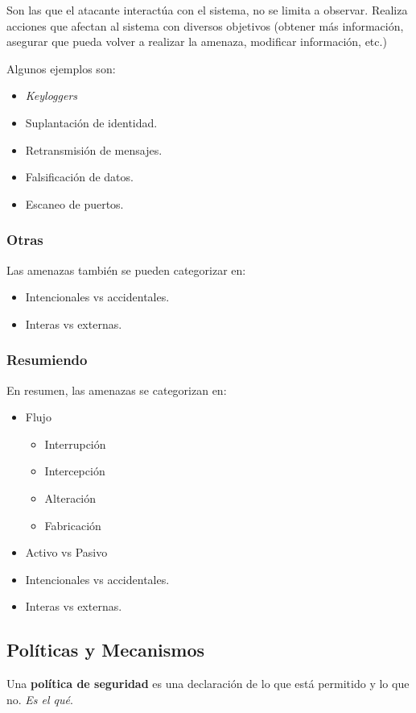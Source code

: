 \documentclass[]{article}
\begin{document}
Son las que el atacante interactúa con el sistema, no se limita a observar. Realiza acciones que afectan al sistema con diversos objetivos (obtener más información, asegurar que pueda volver a realizar la amenaza, modificar información, etc.)

Algunos ejemplos son:
\begin{itemize}
	\item \emph{Keyloggers}
	\item Suplantación de identidad.
	\item Retransmisión de mensajes.
	\item Falsificación de datos.
	\item Escaneo de puertos.
\end{itemize}

\subsubsection{Otras}
Las amenazas también se pueden categorizar en:

\begin{itemize}
	\item Intencionales vs accidentales.
	\item Interas vs externas.
\end{itemize}


\subsubsection{Resumiendo}
En resumen, las amenazas se categorizan en:
\begin{itemize}
	\item Flujo
	\begin{itemize}
		\item Interrupción
		\item Intercepción
		\item Alteración
		\item Fabricación
	\end{itemize}
	\item Activo vs Pasivo
	\item Intencionales vs accidentales.
	\item Interas vs externas.
\end{itemize}



\subsection{Políticas y Mecanismos}
Una \textbf{política de seguridad} es una declaración de lo que está permitido y lo que no. \emph{Es el qué}.
\end{document}
